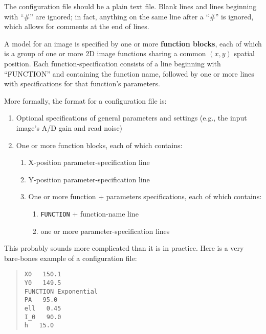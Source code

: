 \documentclass[10pt,a4paper,article]{memoir}
\begin{document}
The configuration file should be a plain text file. Blank lines and
lines beginning with ``\#'' are ignored; in fact, anything on the same line after a
``\#'' is ignored, which allows for comments at the end of lines.

A model for an image is specified by one or more \textbf{function blocks}, each of
which is a group of one or more 2D image functions sharing a common $(x,y)$
spatial position. Each function-specification consists of a line beginning with
``FUNCTION'' and containing the function name, followed by one or more lines
with specifications for that function's parameters.

\bigskip

More formally, the format for a configuration file is:
\begin{enumerate}
\item Optional specifications of general parameters and settings (e.g., the
input image's A/D gain and read noise)
\item One or more function blocks, each of which contains:
\begin{enumerate}
\item X-position parameter-specification line
\item Y-position parameter-specification line
\item One or more function + parameters specifications, each of which contains:
\begin{enumerate}
\item \texttt{FUNCTION} + function-name line
\item one or more parameter-specification lines
\end{enumerate}
\end{enumerate}
\end{enumerate}

This probably sounds more complicated than it is in practice.
Here is a very bare-bones example of a configuration file:

\begin{quote}
  \texttt{X0  ~  150.1}\\
  \texttt{Y0  ~  149.5}\\
  \texttt{FUNCTION   Exponential}\\
  \texttt{PA  ~  95.0}\\
  \texttt{ell  ~  0.45}\\
  \texttt{I\_0 ~  90.0}\\
  \texttt{h   ~  15.0}\\
\end{quote}
\end{document}
